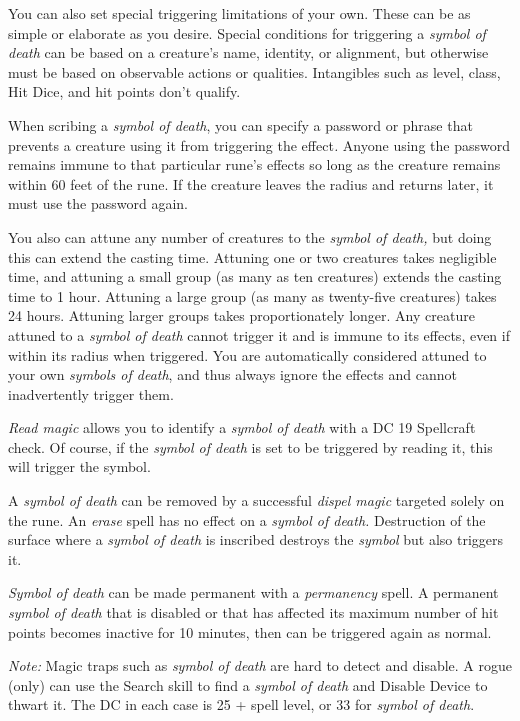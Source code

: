 \documentclass{article}
\begin{document}
You can also set special triggering limitations of your own. These can be as simple 
or elaborate as you desire. Special conditions for triggering a \textit{symbol 
of death }can be based on a creature's name, identity, or alignment, but otherwise 
must be based on observable actions or qualities. Intangibles such as level, class, 
Hit Dice, and hit points don't qualify. 

When scribing a \textit{symbol of death}, you can specify a password or phrase 
that prevents a creature using it from triggering the effect\textit{. }Anyone using 
the password remains immune to that particular rune's effects so long as the creature 
remains within 60 feet of the rune. If the creature leaves the radius and returns 
later, it must use the password again.

You also can attune any number of creatures to the \textit{symbol of death, }but 
doing this can extend the casting time. Attuning one or two creatures takes negligible 
time, and attuning a small group (as many as ten creatures) extends the casting 
time to 1 hour. Attuning a large group (as many as twenty-five creatures) takes 
24 hours. Attuning larger groups takes proportionately longer. Any creature attuned 
to a \textit{symbol of death }cannot trigger it and is immune to its effects, even 
if within its radius when triggered. You are automatically considered attuned to 
your own \textit{symbols of death}, and thus always ignore the effects and cannot 
inadvertently trigger them.

\textit{Read magic }allows you to identify a \textit{symbol of death }with a DC 
19 Spellcraft check. Of course, if the \textit{symbol of death }is set to be triggered 
by reading it, this will trigger the symbol.

A \textit{symbol of death }can be removed by a successful \textit{dispel magic 
}targeted solely on the rune. An \textit{erase }spell has no effect on a \textit{symbol 
of death. }Destruction of the surface where a \textit{symbol of death }is inscribed 
destroys the \textit{symbol }but also triggers it.

\textit{Symbol of death }can be made permanent with a \textit{permanency }spell. 
A permanent \textit{symbol of death }that is disabled or that has affected its 
maximum number of hit points becomes inactive for 10 minutes, then can be triggered 
again as normal.

\textit{Note: }Magic traps such as \textit{symbol of death }are hard to detect 
and disable. A rogue (only) can use the Search skill to find a \textit{symbol of 
death }and Disable Device to thwart it. The DC in each case is 25 + spell level, 
or 33 for \textit{symbol of death}.
\end{document}

